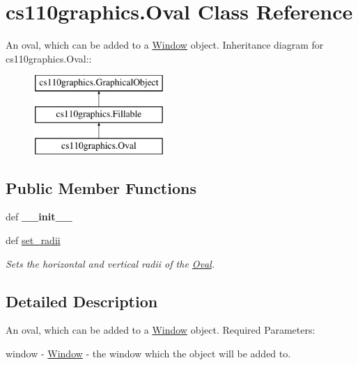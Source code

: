\hypertarget{classcs110graphics_1_1Oval}{
\section{cs110graphics.Oval Class Reference}
\label{classcs110graphics_1_1Oval}
}


An oval, which can be added to a \hyperlink{classcs110graphics_1_1Window}{Window} object.  
Inheritance diagram for cs110graphics.Oval::\begin{figure}[H]
\begin{center}
\leavevmode
\includegraphics[height=3cm]{classcs110graphics_1_1Oval}
\end{center}
\end{figure}
\subsection*{Public Member Functions}
\begin{DoxyCompactItemize}
\item 
\hypertarget{classcs110graphics_1_1Oval_a7f71ea6ad224b510456c9de76e72ff11}{
def {\bfseries \_\-\_\-init\_\-\_\-}}
\label{classcs110graphics_1_1Oval_a7f71ea6ad224b510456c9de76e72ff11}

\item 
def \hyperlink{classcs110graphics_1_1Oval_a5d699cffc26c514e0eb9bdfde9a2951b}{set\_\-radii}
\begin{DoxyCompactList}\small\item\em Sets the horizontal and vertical radii of the \hyperlink{classcs110graphics_1_1Oval}{Oval}. \item\end{DoxyCompactList}\end{DoxyCompactItemize}


\subsection{Detailed Description}
An oval, which can be added to a \hyperlink{classcs110graphics_1_1Window}{Window} object. Required Parameters:
\begin{DoxyItemize}
\item window -\/ \hyperlink{classcs110graphics_1_1Window}{Window} -\/ the window which the object will be added to.
\end{DoxyItemize}

